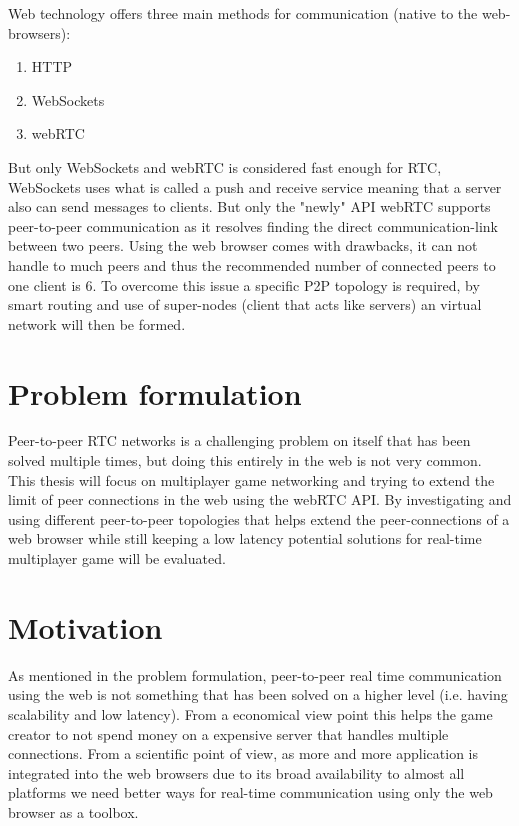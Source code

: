 \documentclass[12pt]{article}
\begin{document}
\noindent Web technology offers three main methods for communication (native to the web-browsers):
\begin{enumerate}
  \item HTTP 
  \item WebSockets 
  \item webRTC 
\end{enumerate}

But only WebSockets and webRTC is considered fast enough for RTC, WebSockets
uses what is called a push and receive service meaning that a server also can 
send messages to clients. But only the "newly" API webRTC supports peer-to-peer 
communication as it resolves finding the direct communication-link between two peers. 
Using the web browser comes with drawbacks, it can not handle to much peers and thus the 
recommended number of connected peers to one client is 6. To overcome this issue a specific 
P2P topology is required, by smart routing and use of super-nodes (client that acts like servers)
an virtual network will then be formed.


\section*{Problem formulation}
Peer-to-peer RTC networks is a challenging problem on itself that has been solved multiple times, 
but doing this entirely in the web is not very common. This thesis will focus on multiplayer game networking 
and trying to extend the limit of peer connections in the web using the webRTC API. By investigating and 
using different peer-to-peer topologies that helps extend the peer-connections of a web browser while still 
keeping a low latency potential solutions for real-time multiplayer game will be evaluated. 

\section*{Motivation}
As mentioned in the problem formulation, peer-to-peer real time communication using the web is not something that 
has been solved on a higher level (i.e. having scalability and low latency). From a economical view point this 
helps the game creator to not spend money on a expensive server that handles multiple connections. From a scientific 
point of view, as more and more application is integrated into the web browsers due to its broad availability to almost all 
platforms we need better ways for real-time communication using only the web browser as a toolbox. 
\end{document}
